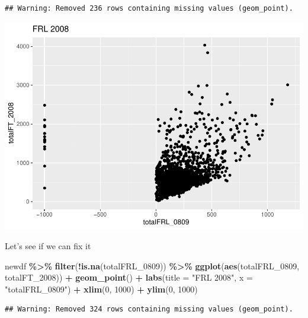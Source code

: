 \documentclass[
]{book}
\newenvironment{Shaded}{\begin{snugshade}}{\end{snugshade}}
\newcommand{\DataTypeTok}[1]{\textcolor[rgb]{0.13,0.29,0.53}{#1}}
\newcommand{\DecValTok}[1]{\textcolor[rgb]{0.00,0.00,0.81}{#1}}
\newcommand{\KeywordTok}[1]{\textcolor[rgb]{0.13,0.29,0.53}{\textbf{#1}}}
\newcommand{\NormalTok}[1]{#1}
\newcommand{\OperatorTok}[1]{\textcolor[rgb]{0.81,0.36,0.00}{\textbf{#1}}}
\newcommand{\StringTok}[1]{\textcolor[rgb]{0.31,0.60,0.02}{#1}}
\begin{document}
\begin{verbatim}
## Warning: Removed 236 rows containing missing values (geom_point).
\end{verbatim}

\includegraphics{test_course_notes_files/figure-latex/unnamed-chunk-37-1.pdf}

Let's see if we can fix it

\begin{Shaded}
\begin{Highlighting}[]
\NormalTok{newdf }\OperatorTok{\%\textgreater{}\%}\StringTok{ }
\StringTok{  }\KeywordTok{filter}\NormalTok{(}\OperatorTok{!}\KeywordTok{is.na}\NormalTok{(totalFRL\_}\DecValTok{0809}\NormalTok{)) }\OperatorTok{\%\textgreater{}\%}
\StringTok{  }\KeywordTok{ggplot}\NormalTok{(}\KeywordTok{aes}\NormalTok{(totalFRL\_}\DecValTok{0809}\NormalTok{, totalFT\_}\DecValTok{2008}\NormalTok{)) }\OperatorTok{+}
\StringTok{  }\KeywordTok{geom\_point}\NormalTok{() }\OperatorTok{+}
\StringTok{  }\KeywordTok{labs}\NormalTok{(}\DataTypeTok{title =} \StringTok{"FRL 2008"}\NormalTok{, }
       \DataTypeTok{x =} \StringTok{"totalFRL\_0809"}\NormalTok{) }\OperatorTok{+}
\StringTok{  }\KeywordTok{xlim}\NormalTok{(}\DecValTok{0}\NormalTok{, }\DecValTok{1000}\NormalTok{) }\OperatorTok{+}
\StringTok{  }\KeywordTok{ylim}\NormalTok{(}\DecValTok{0}\NormalTok{, }\DecValTok{1000}\NormalTok{)}
\end{Highlighting}
\end{Shaded}

\begin{verbatim}
## Warning: Removed 324 rows containing missing values (geom_point).
\end{verbatim}
\end{document}
